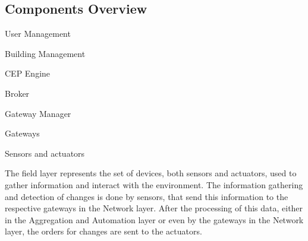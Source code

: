 \subsection{Components Overview}

\begin{Paragraph}{User Management}
	
\end{Paragraph}

\begin{Paragraph}{Building Management}
	
\end{Paragraph}

\begin{Paragraph}{CEP Engine}
	
\end{Paragraph}

\begin{Paragraph}{Broker}
	
\end{Paragraph}

\begin{Paragraph}{Gateway Manager}
	
\end{Paragraph}

\begin{Paragraph}{Gateways}
	
\end{Paragraph}

\begin{Paragraph}{Sensors and actuators}
	
The field layer represents the set of devices, both sensors and actuators, used to gather information and interact with the environment. The information gathering and detection of changes is done by sensors, that send this information to the respective gateways in the Network layer. After the processing of this data, either in the Aggregation and Automation layer or even by the gateways in the Network layer, the orders for changes are sent to the actuators.
	
\end{Paragraph}











